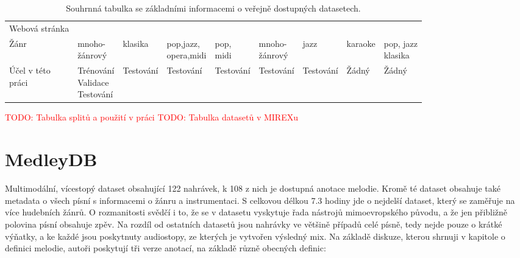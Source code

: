 \begin{table}[h!]
{\begin{tabular}{lllllllll}
        Webová stránka   & \tablefootnote{\url{https://medleydb.weebly.com/}} & \tablefootnote{\url{https://www.upf.edu/web/mtg/orchset}}      & \tablefootnote{\url{http://ismir2004.ismir.net/melody_contest/results.html}}       & \tablefootnote{\url{https://labrosa.ee.columbia.edu/projects/melody/}}       & \tablefootnote{\url{http://synthdatasets.weebly.com/mdb-melody-synth.html}}        & \tablefootnote{\url{https://jazzomat.hfm-weimar.de/}}    & \tablefootnote{\url{https://sites.google.com/site/unvoicedsoundseparation/mir-1k}} & \tablefootnote{\url{https://staff.aist.go.jp/m.goto/RWC-MDB/}} \\
        Žánr    & \shortstack[l]{mnoho-\\žánrový} & klasika & \shortstack[l]{pop,jazz,\\opera,midi} & \shortstack[l]{pop,\\midi} & \shortstack[l]{mnoho-\\žánrový} & jazz & karaoke & \shortstack[l]{pop, jazz\\klasika}  \\
        \shortstack[l]{Účel v této\\práci} & \shortstack[l]{Trénování\\Validace\\Testování} & Testování & Testování  & Testování  & Testování & Testování & Žádný & Žádný \\
    \bottomrule
    \end{tabular}
}%

\caption{Souhrnná tabulka se základními informacemi o veřejně dostupných datasetech.}\label{tab:dataset_summary}
\end{table}


\textcolor{red}{TODO: Tabulka splitů a použití v práci}
\textcolor{red}{TODO: Tabulka datasetů v MIREXu}



\section{MedleyDB}

\cite{Bittner2014}

Multimodální, vícestopý dataset obsahující 122 nahrávek, k 108 z nich je dostupná anotace melodie. Kromě té dataset obsahuje také metadata o všech písní s informacemi o žánru a instrumentaci. S celkovou délkou 7.3 hodiny jde o nejdelší dataset, který se zaměřuje na více hudebních žánrů. O rozmanitosti svědčí i to, že se v datasetu vyskytuje řada nástrojů mimoevropského původu, a že jen přibližně polovina písní obsahuje zpěv. Na rozdíl od ostatních datasetů jsou nahrávky ve většině případů celé písně, tedy nejde pouze o krátké výňatky, a ke každé jsou poskytnuty audiostopy, ze kterých je vytvořen výsledný mix.
Na základě diskuze, kterou shrnuji v kapitole o definici melodie, autoři poskytují tři verze anotací, na základě různě obecných definic:

